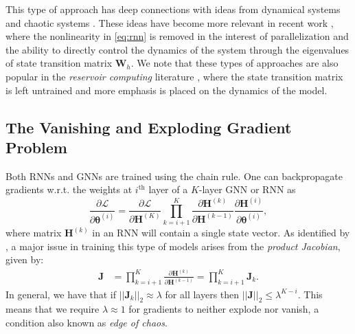 This type of approach has deep connections with ideas from dynamical systems \cite{strogatz2018nonlinear} and chaotic systems \cite{engelken2023lyapunov}. These ideas have become more relevant in recent work \cite{Gu2019LearningMR, orvieto2023resurrecting}, where the nonlinearity in \eqref{eq:rnn} is removed in the interest of parallelization and the ability to directly control the dynamics of the system through the eigenvalues of state transition matrix $\mathbf{W}_h$. We note that these types of approaches are also popular in the \textit{reservoir computing} literature \cite{jaeger2001echo}, where the state transition matrix is left untrained and more emphasis is placed on the dynamics of the model.
\vspace{-0.2cm}

\subsection{The Vanishing and Exploding Gradient Problem}

Both RNNs and GNNs are trained using the chain rule. One can backpropagate gradients w.r.t. the weights at $i^{\text{th}}$ layer of a $K$-layer GNN or RNN as 
\begin{equation}
	\frac{\partial\mathcal{L}}{\partial\mathbf{\boldsymbol{\theta}}^{(i)}}
	=
	\frac{\partial\mathcal{L}}{\partial\mathbf{H}^{(K)}}
	\prod_{k=i+1}^{K}
	\frac{\partial\mathbf{H}^{(k)}}{\partial\mathbf{H}^{(k-1)}}
	\frac{\partial\mathbf{H}^{(i)}}{\partial\mathbf{\boldsymbol{\theta}}^{(i)}},
\end{equation}
where matrix $\mathbf{H}^{(k)}$ in an RNN will contain a single state vector. As identified by \citet{pascanu2013difficulty}, a major issue in training this type of models arises from the \textit{product Jacobian}, given by:  
\begin{align}
	\mathbf{J}
	&=
	\prod_{k=i+1}^{K}
	\frac{\partial\mathbf{H}^{(k)}}{\partial\mathbf{H}^{(k-1)}} = \prod_{k=i+1}^{K}\mathbf{J}_k.
\end{align}
In general, we have that if $||\mathbf{J}_k||_2 \approx \lambda$ for all layers then $||\mathbf{J}||_2 \le \lambda^{K-i}$. This means that we require $\lambda \approx 1$ for gradients to neither explode nor vanish, a condition also known as \textit{edge of chaos}. %

